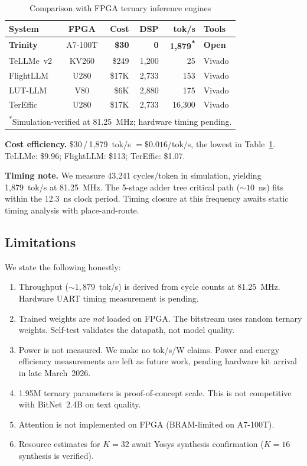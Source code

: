 \documentclass[conference]{IEEEtran}
\newcommand{\tmark}[1]{\textsuperscript{#1}}
\begin{document}
\begin{table}[t]
\centering
\caption{Comparison with FPGA ternary inference engines}
\label{tab:comparison}
\setlength{\tabcolsep}{3pt}
\begin{tabular}{@{}lcrrrl@{}}
\toprule
\textbf{System} & \textbf{FPGA} & \textbf{Cost} & \textbf{DSP} & \textbf{tok/s} & \textbf{Tools} \\
\midrule
\textbf{Trinity} & A7-100T & \textbf{\$30} & \textbf{0} & \textbf{1,879\tmark{*}} & \textbf{Open} \\
TeLLMe~v2 & KV260 & \$249 & 1,200 & 25 & Vivado \\
FlightLLM & U280 & \$17K & 2,733 & 153 & Vivado \\
LUT-LLM & V80 & \$6K & 2,880 & 175 & Vivado \\
TerEffic & U280 & \$17K & 2,733 & 16,300 & Vivado \\
\bottomrule
\multicolumn{6}{l}{\footnotesize \tmark{*}Simulation-verified at 81.25~MHz; hardware timing pending.}
\end{tabular}
\end{table}

\textbf{Cost efficiency.}  \$30\,/\,1{,}879~tok/s $= \$0.016$/tok/s, the
lowest in Table~\ref{tab:comparison}.  TeLLMe: \$9.96; FlightLLM: \$113;
TerEffic: \$1.07.

\textbf{Timing note.}  We measure 43,241 cycles/token in simulation, yielding
1,879~tok/s at 81.25~MHz.  The 5-stage adder tree critical path
(${\sim}10$~ns) fits within the 12.3~ns clock period.  Timing closure at this
frequency awaits static timing analysis with place-and-route.

\subsection{Limitations}

We state the following honestly:
\begin{enumerate}
  \item Throughput (${\sim}1{,}879$~tok/s) is derived from cycle counts at
    81.25~MHz.  Hardware UART timing measurement is pending.
  \item Trained weights are \emph{not} loaded on FPGA.  The bitstream uses
    random ternary weights.  Self-test validates the datapath, not model
    quality.
  \item Power is not measured.  We make no tok/s/W claims.  Power and energy
    efficiency measurements are left as future work, pending hardware kit
    arrival in late March~2026.
  \item 1.95M ternary parameters is proof-of-concept scale.
    This is not competitive with BitNet~2.4B on text quality.
  \item Attention is not implemented on FPGA (BRAM-limited on A7-100T).
  \item Resource estimates for $K\!=\!32$ await Yosys synthesis confirmation
    ($K\!=\!16$ synthesis is verified).
\end{enumerate}
\end{document}
